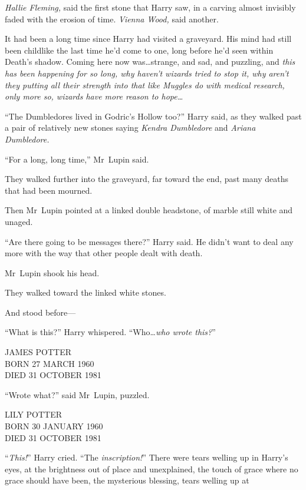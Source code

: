 \emph{Hallie Fleming,} said the first stone that Harry saw, in a carving almost
invisibly faded with the erosion of time. \emph{Vienna Wood,} said another.

It had been a long time since Harry had visited a graveyard. His mind had still
been childlike the last time he’d come to one, long before he’d seen within
Death’s shadow. Coming here now was…strange, and sad, and puzzling, and
\emph{this has been happening for so long, why haven’t wizards tried to stop
it, why aren’t they putting all their strength into that like Muggles do with
medical research, only more so, wizards have more reason to hope…}

“The Dumbledores lived in Godric’s Hollow too?” Harry said, as they walked past
a pair of relatively new stones saying \emph{Kendra Dumbledore} and
\emph{Ariana Dumbledore.}

“For a long, long time,” Mr~Lupin said.

They walked further into the graveyard, far toward the end, past many deaths
that had been mourned.

Then Mr~Lupin pointed at a linked double headstone, of marble still white and
unaged.

“Are there going to be messages there?” Harry said. He didn’t want to deal any
more with the way that other people dealt with death.

Mr~Lupin shook his head.

They walked toward the linked white stones.

And stood before—

“What is this?” Harry whispered. “Who…\emph{who wrote this?}”

\begin{center}
JAMES POTTER\\
BORN 27 MARCH 1960\\
DIED 31 OCTOBER 1981
\end{center}

“Wrote what?” said Mr~Lupin, puzzled.

\begin{center}
LILY POTTER\\
BORN 30 JANUARY 1960\\
DIED 31 OCTOBER 1981
\end{center}

“\emph{This!}” Harry cried. “The \emph{inscription!}” There were tears welling
up in Harry’s eyes, at the brightness out of place and unexplained, the touch
of grace where no grace should have been, the mysterious blessing, tears
welling up at

